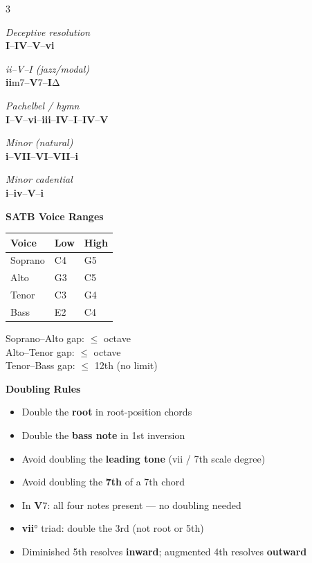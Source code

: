 \documentclass[letterpaper]{article}
\newcommand{\rn}[2]{\textbf{#1}#2}
\begin{document}
\begin{multicols}{3}
{\vspace{2mm}
\textit{Deceptive resolution}\\
\rn{I}{}--\rn{IV}{}--\rn{V}{}--\rn{vi}{}

\vspace{2mm}
\textit{ii--V--I (jazz/modal)}\\
\rn{ii}{m7}--\rn{V}{7}--\rn{I}{}Δ

\vspace{2mm}
\textit{Pachelbel / hymn}\\
\rn{I}{}--\rn{V}{}--\rn{vi}{}--\rn{iii}{}--\rn{IV}{}--\rn{I}{}--\rn{IV}{}--\rn{V}{}

\vspace{2mm}
\textit{Minor (natural)}\\
\rn{i}{}--\rn{VII}{}--\rn{VI}{}--\rn{VII}{}--\rn{i}{}

\vspace{2mm}
\textit{Minor cadential}\\
\rn{i}{}--\rn{iv}{}--\rn{V}{}--\rn{i}{}
}

\columnbreak

{\small\colorbox{headerbg}{\color{white}\textbf{\quad SATB Voice Ranges\quad}}}

\vspace{2mm}
{\small
\begin{tabular}{@{}lll@{}}
\textbf{Voice} & \textbf{Low} & \textbf{High} \\
\midrule
Soprano & C4 & G5 \\
Alto    & G3 & C5 \\
Tenor   & C3 & G4 \\
Bass    & E2 & C4 \\
\end{tabular}

\vspace{1mm}
Soprano--Alto gap: $\leq$ octave\\
Alto--Tenor gap: $\leq$ octave\\
Tenor--Bass gap: $\leq$ 12th (no limit)
}

\vspace{4mm}
{\small\colorbox{headerbg}{\color{white}\textbf{\quad Doubling Rules\quad}}}

\vspace{2mm}
{\small
\begin{itemize}
  \item Double the \textbf{root} in root-position chords
  \item Double the \textbf{bass note} in 1st inversion
  \item Avoid doubling the \textbf{leading tone} (vii / 7th scale degree)
  \item Avoid doubling the \textbf{7th} of a 7th chord
  \item In \rn{V}{7}: all four notes present --- no doubling needed
  \item \rn{vii}{°} triad: double the 3rd (not root or 5th)
  \item Diminished 5th resolves \textbf{inward}; augmented 4th resolves \textbf{outward}
\end{itemize}
}


\end{multicols}
\end{document}
